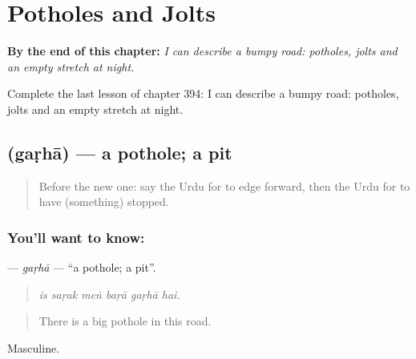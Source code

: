
\chapter{Potholes and Jolts}
\label{ch:ur-potholes-and-jolts}

\begin{chapteropening}
\textbf{By the end of this chapter:} \emph{I can describe a bumpy road: potholes, jolts and an empty stretch at night.}

Complete the last lesson of chapter 394: I can describe a bumpy road: potholes, jolts and an empty stretch at night.
\end{chapteropening}

\section[\texorpdfstring{\ur{گڑھا} (gaṛhā)}{گڑھا (gaṛhā)}]{ (gaṛhā) — a pothole; a pit}

\label{lesson:UR-C394-garha}



\begin{quote}
Before the new one: say the Urdu for to edge forward, then the Urdu for to have (something) stopped.
\end{quote}

\subsection*{You'll want to know: }
\textbf{} — \emph{gaṛhā} — \textquotedblleft{}a pothole; a pit\textquotedblright{}.

\begin{quote}
     
\end{quote}

\begin{quote}
\emph{is saṛak meṅ baṛā gaṛhā hai.}
\end{quote}

\begin{quote}
There is a big pothole in this road.
\end{quote}

Masculine.

